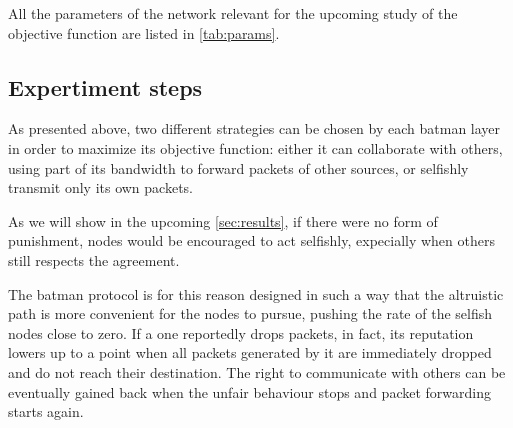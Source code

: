\documentclass[conference]{IEEEtran}
\begin{document}
All the parameters of the network relevant for the upcoming study of the objective function are listed in \autoref{tab:params}.

\renewcommand\theadalign{l}

\begin{table}[h]
\vspace{0.1cm}
\caption{Relevant parameters for building the network}
\label{tab:params}
\end{table}

\subsection{Expertiment steps}

As presented above, two different strategies can be chosen by each \gls{batman} layer in order to maximize its objective function: either it can collaborate with others, using part of its bandwidth to forward packets of other sources, or selfishly transmit only its own packets.

As we will show in the upcoming \autoref{sec:results}, if there were no form of punishment, nodes would be encouraged to act selfishly, expecially when others still respects the agreement.

The \gls{batman} protocol is for this reason designed in such a way that the altruistic path is more convenient for the nodes to pursue, pushing the rate of the selfish nodes close to zero.
If a one reportedly drops packets, in fact, its reputation lowers up to a point when all packets generated by it are immediately dropped and do not reach their destination. The right to communicate with others can be eventually gained back when the unfair behaviour stops and packet forwarding starts again.
\end{document}
